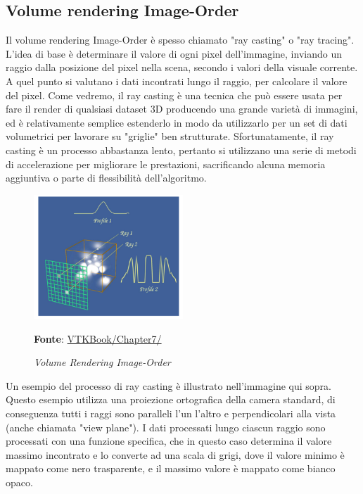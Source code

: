 \subsection{Volume rendering Image-Order}\label{sec:volume-image-order}
Il volume rendering Image-Order è spesso chiamato "ray casting" o "ray tracing". L'idea di base è determinare il valore di ogni pixel dell'immagine, inviando un raggio dalla posizione del pixel nella scena, secondo i valori della visuale corrente. A quel punto si  valutano i dati incontrati lungo il raggio, per calcolare il valore del pixel. Come vedremo, il ray casting è una tecnica che può essere usata per fare il render di qualsiasi dataset 3D producendo una grande varietà di immagini, ed è relativamente semplice estenderlo in modo da utilizzarlo per un set di dati volumetrici per lavorare su "griglie" ben strutturate. Sfortunatamente, il ray casting è un processo abbastanza lento, pertanto si utilizzano una serie di metodi di accelerazione per migliorare le prestazioni, sacrificando alcuna memoria aggiuntiva o parte di flessibilità dell'algoritmo.

\begin{figure}[h]
    \centering
    \includegraphics[width=0.5\textwidth]{immagini/volumerendering/imageorder.png}
    \caption{\textit{Volume Rendering Image-Order}}
    \textbf{Fonte}: \href{https://lorensen.github.io/VTKExamples/site/VTKBook/07Chapter7/}{VTKBook/Chapter7/}
    \label{fig: Volume Rendering Image-Order}
\end{figure}

Un esempio del processo di ray casting è illustrato nell'immagine qui sopra. Questo esempio utilizza una proiezione ortografica della camera standard, di conseguenza tutti i raggi sono paralleli l'un l'altro e perpendicolari alla vista (anche chiamata "view plane"). I dati processati lungo ciascun raggio sono processati con una funzione specifica, che in questo caso determina il valore massimo incontrato e lo converte ad una scala di grigi, dove il valore minimo è mappato come nero trasparente, e il massimo valore è mappato come bianco opaco.

